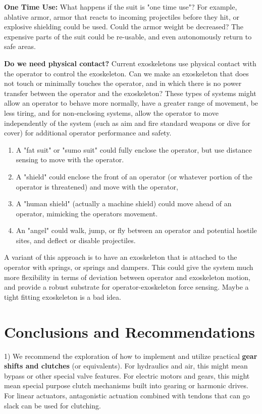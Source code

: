 \documentclass[letterpaper,12pt,fullpage]{article}
\begin{document}
{\bf One Time Use:}
What happens if the suit is "one time use"? For example, ablative armor,
armor that reacts to incoming projectiles before they hit,
or explosive shielding could be used. Could the armor weight be decreased?
The expensive parts of the suit could be re-usable, and even autonomously
return to safe areas.

{\bf Do we need physical contact?}
Current exoskeletons use physical contact with the operator to control
the exoskeleton. Can we make an exoskeleton that does not touch or
minimally touches the operator, and in which there is no power
transfer between the operator and the exoskeleton? These types of
systems might allow an operator to behave more normally, have a
greater range of movement, be less tiring, and for non-enclosing
systems, allow the operator to move independently of the system (such
as aim and fire standard weapons or dive for cover) for additional
operator performance and safety.
\begin{enumerate}
\item
A "fat suit" or "sumo suit" could fully enclose the operator, but
use distance sensing to move with the operator.
\item
A "shield" could enclose the front of an operator (or whatever
portion of the operator is threatened) and move with the operator,
\item
A "human shield" (actually a machine shield) could move ahead of
an operator, mimicking the operators movement.
\item
An "angel" could walk, jump, or fly between an operator and potential
hostile sites, and deflect or disable projectiles.
\end{enumerate}
A variant of this approach is to have an exoskeleton that is attached
to the operator with springs, or springs and dampers. This could give
the system much more flexibility in terms of deviation between
operator and exoskeleton motion, and provide a robust substrate for
operator-exoskeleton force sensing. Maybe a tight fitting exoskeleton
is a bad idea.

\section{Conclusions and Recommendations}

1) We recommend the exploration of how to implement and utilize practical
{\bf gear shifts and clutches} (or equivalents). For hydraulics and air, this might mean
bypass or other special valve features.
For electric motors and gears, this might mean special purpose clutch mechanisms
built into gearing or harmonic drives. For linear actuators, antagonistic actuation
combined with tendons that can go slack can be used for clutching.
\end{document}
